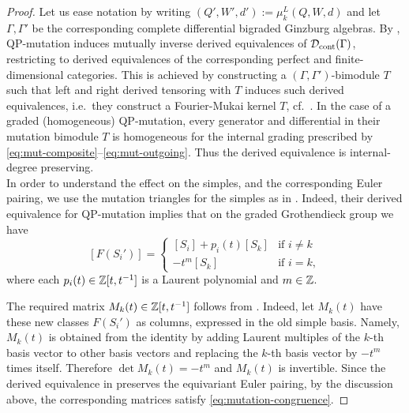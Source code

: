 \begin{proof} Let us ease notation by writing $(Q',W',d'):=\mu_k^L(Q,W,d)$ and let \(\Gamma,\Gamma'\) be the corresponding complete differential bigraded Ginzburg algebras. By \cite[Theorem 3.2.(b)]{KellerYang}, QP-mutation induces mutually inverse derived equivalences of $\mathcal D_{\mathrm{cont}}(\Gamma)$,
restricting to derived equivalences of the corresponding perfect and finite-dimensional categories. This is achieved by constructing a $(\Gamma,\Gamma')$-bimodule $T$ such that left and right derived tensoring with $T$ induces such derived equivalences, i.e.~they construct a Fourier-Mukai kernel $T$, cf.~\cite[Section 3.4]{KellerYang}. In the case of a graded (homogeneous)
QP-mutation, every generator and differential in their mutation bimodule $T$ is
homogeneous for the internal grading prescribed by
\eqref{eq:mut-composite}--\eqref{eq:mut-outgoing}.  Thus the derived equivalence is
internal-degree preserving.\\

In order to understand the effect on the simples, and the corresponding Euler pairing, we use the mutation triangles for the simples as in
\cite[Remark 3.3]{KellerYang}. Indeed, their derived equivalence for QP-mutation implies that on the graded Grothendieck group
we have
\begin{equation}\label{eq:K0-nonk}
 [F(S_i')]=
 \begin{cases}
[S_i]+p_i(t)[S_k] & \mbox{if }i\ne k\\
-t^m[S_k] & \mbox{if }i=k,
 \end{cases}
\end{equation}
where each $p_i(t)\in\mathbb Z[t,t^{-1}]$ is a Laurent polynomial and $m\in\mathbb Z$.

The required matrix $M_k(t)\in\mathbb Z[t,t^{-1}]$ follows from . Indeed, let \(M_k(t)\)
have these new classes $F(S_i')$ as columns, expressed in the old simple basis. Namely, \(M_k(t)\) is obtained from the identity by adding Laurent multiples of the \(k\)-th basis vector to
other basis vectors and replacing the \(k\)-th basis vector by
\(-t^m\) times itself. Therefore \(\det M_k(t)=-t^m\) and $M_k(t)$ is invertible. Since the derived equivalence in \cite[Theorem 3.2]{KellerYang} preserves the equivariant Euler pairing, by the discussion above, the corresponding matrices satisfy \eqref{eq:mutation-congruence}.\end{proof}

